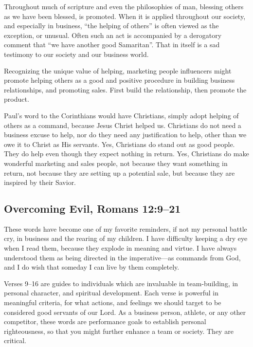 \documentclass[12pt]{memoir}
\begin{document}
Throughout much of scripture and even the philosophies of man, blessing
others as we have been blessed, is promoted. When it is applied throughout
our society, and especially in business, ``the helping of others''
is often viewed as the exception, or unusual. Often such an act is
accompanied by a derogatory comment that ``we have another good Samaritan''.
That in itself is a sad testimony to our society and our business
world.

Recognizing the unique value of helping, marketing people influencers might promote helping others as a good and positive procedure in building business relationships, and promoting sales.
First build the relationship, then promote the product.

Paul's word to the Corinthians would have Christians, simply adopt
helping of others as a command, because Jesus Christ helped
us. Christians do not need a business excuse to help, nor do they
need any justification to help, other than we owe it to Christ as
His servants. Yes, Christians do stand out as good people. They do
help even though they expect nothing in return. Yes, Christians do
make wonderful marketing and sales people, not because they want something
in return, not because they are setting up a potential sale, but because
they are inspired by their Savior.

\subsection[Overcoming Evil]{Overcoming Evil, Romans 12:9--21}

These words have become one of my favorite reminders, if not my personal battle cry, in business and the rearing of my children. I have difficulty
keeping a dry eye when I read them, because they explode
in meaning and virtue. I have always understood them as being directed
in the imperative---as commands from God, and I do wish that someday
I can live by them completely.

Verses 9--16 are guides to individuals which are invaluable in team-building,
in personal character, and spiritual development. Each verse is
powerful in meaningful criteria, for what actions, and feelings
we should target to be considered good servants of our Lord.
As a business person, athlete, or any other competitor, these words
are performance goals to establish personal righteousness, so that
you might further enhance a team or society. They are critical.
\end{document}
